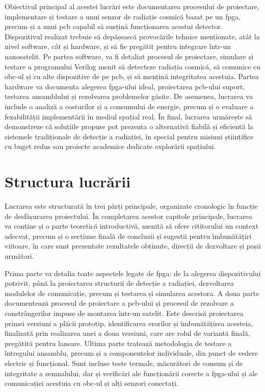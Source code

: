 \documentclass[12pt,a4paper]{report}
\begin{document}
Obiectivul principal al acestei lucrări este documentarea procesului de proiectare, implementare și testare a unui senzor de radiație cosmică bazat pe un \gls{fpga}, precum și a unui \gls{pcb} capabil să susțină funcționarea acestui detector. Dispozitivul realizat trebuie să depășească provocările tehnice menționate, atât la nivel software, cât și hardware, și să fie pregătit pentru integrare într-un nanosatelit. Pe partea software, va fi detaliat procesul de proiectare, simulare și testare a programului Verilog menit să detecteze radiația cosmică, să comunice cu \gls{obc}-ul și cu alte dispozitive de pe \gls{pcb}, și să mențină integritatea acestuia. Partea hardware va documenta alegerea \gls{fpga}-ului ideal, proiectarea \gls{pcb}-ului suport, testarea ansamblului și rezolvarea problemelor găsite. De asemenea, lucrarea va include o analiză a costurilor și a consumului de energie, precum și o evaluare a fezabilității implementării în mediul spațial real. În final, lucrarea urmărește să demonstreze că soluțiile propuse pot prezenta o alternativă fiabilă și eficientă la sistemele tradiționale de detecție a radiației, în special pentru misiuni științifice cu buget redus sau proiecte academice dedicate explorării spațiului.

\section{Structura lucrării}
Lucrarea este structurată în trei părți principale, organizate cronologic în funcție de desfășurarea proiectului. În completarea acestor capitole principale, lucrarea va conține și o parte teoretică introductivă, menită să ofere cititorului un context adecvat, precum și o secțiune finală de concluzii și sugestii pentru îmbunătățiri viitoare, în care sunt prezentate rezultatele obținute, direcții de dezvoltare și pașii următori. 

Prima parte va detalia toate aspectele legate de \gls{fpga}: de la alegerea dispozitivului potrivit,  până la proiectarea structurii de detecție a radiației, dezvoltarea modulelor de comunicație, precum și testarea și simularea acestora. A doua parte documentează procesul de proiectare a \gls{pcb}-ului și procesul de rezolvare a constrângerilor impuse de montarea într-un satelit. Este descrisă proiectarea primei versiuni a plăcii prototip, identificarea erorilor și îmbunătățirea acesteia, finalizată prin realizarea unei a doua versiuni, care are rolul de variantă finală, pregătită pentru lansare. Ultima parte tratează metodologia de testare a întregului ansamblu, precum și a componentelor individuale, din punct de vedere electric și funcțional. Sunt incluse teste termale, măsurători de consum și de integritate a semnalului, dar și verificări ale funcționării corecte a \gls{fpga}-ului și ale comunicației acestuia cu \gls{obc}-ul și alți senzori conectați.
\end{document}
